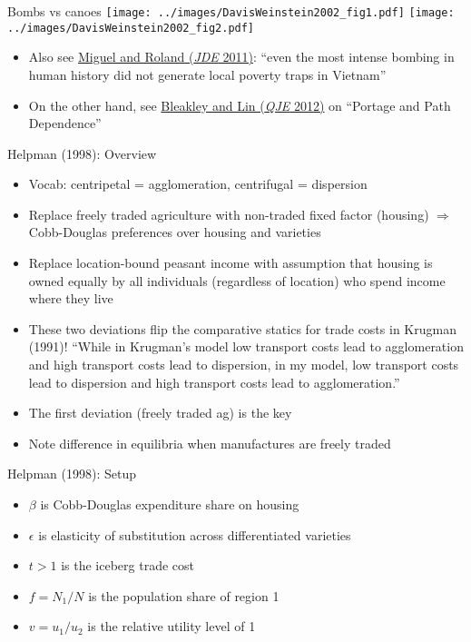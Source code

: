 \documentclass[10pt,notes=hide]{beamer}
\begin{document}
\begin{frame}{Bombs vs canoes}
\texttt{[image: ../images/DavisWeinstein2002\_fig1.pdf]}
\texttt{[image: ../images/DavisWeinstein2002\_fig2.pdf]}
\begin{itemize}
	\item  Also see \href{https://www.sciencedirect.com/science/article/pii/S0304387810000817}{Miguel and Roland (\textit{JDE} 2011)}: ``even the most intense bombing in human history did not generate local poverty traps in Vietnam''
	\item On the other hand, see \href{https://academic.oup.com/qje/article-abstract/127/2/587/1825072}{Bleakley and Lin (\textit{QJE} 2012)} on ``Portage and Path Dependence''
\end{itemize}
\end{frame}
\begin{frame}{Helpman (1998): Overview}
\begin{itemize}
	\item Vocab: centripetal = agglomeration, centrifugal  = dispersion
	\item Replace freely traded agriculture with non-traded fixed factor (housing) $\Rightarrow$ Cobb-Douglas preferences over housing and varieties
	\item Replace location-bound peasant income with assumption that housing is owned equally by all individuals (regardless of location) who spend income where they live
	\item These two deviations flip the comparative statics for trade costs in Krugman (1991)! ``While in Krugman's model low transport costs lead to agglomeration and high transport costs lead to dispersion, in my model, low transport costs lead to dispersion and high transport costs lead to agglomeration.''
	\item The first deviation (freely traded ag) is the key
	\item Note difference in equilibria when manufactures are freely traded
\end{itemize}
\end{frame}
\begin{frame}{Helpman (1998): Setup}
\begin{itemize}
	\item $\beta$ is Cobb-Douglas expenditure share on housing
	\item $\epsilon$ is elasticity of substitution across differentiated varieties
	\item $t>1$ is the iceberg trade cost
	\item $f = N_1 / N$ is the population share of region 1
	\item $v = u_1 / u_2 $ is the relative utility level of 1
\end{itemize}
\end{frame}
\end{document}
